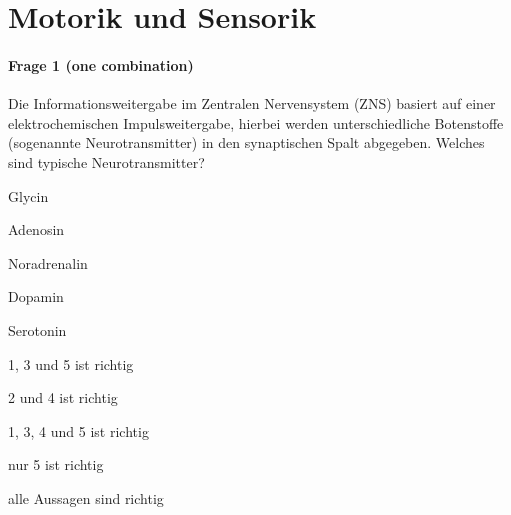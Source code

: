 \section*{Motorik und Sensorik}

\paragraph{Frage 1 (one combination)}

Die Informationsweitergabe im Zentralen Nervensystem (ZNS) basiert auf einer elektrochemischen Impulsweitergabe, hierbei werden unterschiedliche Botenstoffe (sogenannte Neurotransmitter) in den synaptischen Spalt abgegeben. Welches sind typische Neurotransmitter?

\begin{minipage}{.5\linewidth}
  \begin{benumerate}
    \item Glycin
    \item Adenosin
    \item Noradrenalin
    \item Dopamin
    \item Serotonin
  \end{benumerate}
\end{minipage}
\hfill
\begin{minipage}{.5\linewidth}
  \begin{checklist}
    \item 1, 3 und 5 ist richtig
    \item 2 und 4 ist richtig
    \item 1, 3, 4 und 5 ist richtig
    \item nur 5 ist richtig
    \item[\checkedbox] alle Aussagen sind richtig
  \end{checklist}
\end{minipage}